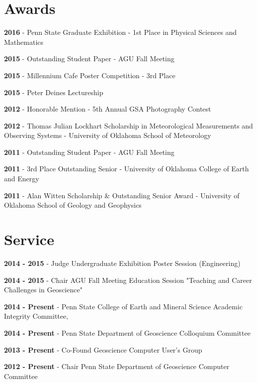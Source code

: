 \documentclass[letterpaper]{article}
\renewenvironment{itemize}{
  \begin{list}{}{
    \setlength{\leftmargin}{1.5em}
  }
}{
  \end{list}
}
\begin{document}
\section*{Awards}
\begin{itemize}
\item \textbf{2016} - Penn State Graduate Exhibition - 1st Place in Physical Sciences and Mathematics
\item \textbf{2015} - Outstanding Student Paper - AGU Fall Meeting
\item \textbf{2015} - Millennium Cafe Poster Competition - 3rd Place
\item \textbf{2015} - Peter Deines Lectureship
\item \textbf{2012} - Honorable Mention - 5th Annual GSA Photography Contest
\item \textbf{2012} - Thomas Julian Lockhart Scholarship in Meteorological Measurements and Observing Systems - University of Oklahoma School of Meteorology
\item \textbf{2011} - Outstanding Student Paper - AGU Fall Meeting
\item \textbf{2011} - 3rd Place Outstanding Senior - University of Oklahoma College of Earth and Energy
\item \textbf{2011} -  Alan Witten Scholarship \& Outstanding Senior Award - University of Oklahoma School of Geology and Geophysics
\end{itemize}

\section*{Service}
\begin{itemize}
\item \textbf{2014 - 2015} - Judge Undergraduate Exhibition Poster Session (Engineering)
\item \textbf{2014 - 2015} - Chair AGU Fall Meeting  Education Session "Teaching and Career Challenges in Geoscience"
\item \textbf{2014 - Present} - Penn State College of Earth and Mineral Science Academic Integrity Committee,
\item \textbf{2014 - Present} - Penn State Department of Geoscience Colloquium Committee
\item \textbf{2013 - Present} - Co-Found Geoscience Computer User's Group
\item \textbf{2012 - Present} - Chair Penn State Department of Geoscience Computer Committee
\end{itemize}
\end{document}
